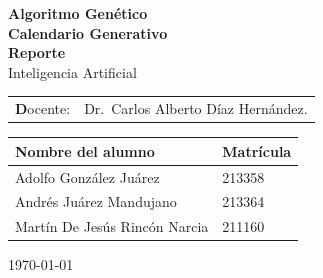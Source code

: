 \begin{titlepage}
    \setlength{\headheight}{46.27916pt}
    
    \thispagestyle{empty}
    
    
    
    
    \vspace*{2cm}
    \begin{center}
    \Huge{\textbf{Algoritmo Genético}\\}
    \LARGE{\textbf{Calendario Generativo}\\[1cm]}
    \vspace{100pt}
    \Huge{\textbf{Reporte}\\}
    \Large{Inteligencia Artificial\\[0.8cm]}
    \end{center}
    
    
    
    
    \vfill
    \begin{center}
        \begin{tabular}{ll}
            \Large{\textbf Docente:} & \Large{Dr.~Carlos Alberto Díaz Hernández.}
        \end{tabular}
    \end{center}

    \centering
    \begin{tabular}{|l|l|}
        \hline
        \textbf{Nombre del alumno} & \textbf{Matrícula} \\
        \hline
        Adolfo González Juárez & 213358 \\
        \hline
        Andrés Juárez Mandujano & 213364 \\
        \hline
        Martín De Jesús Rincón Narcia & 211160 \\
        \hline
    \end{tabular}
    
    \begin{center}
        \today
    \end{center}

    
    \end{titlepage}